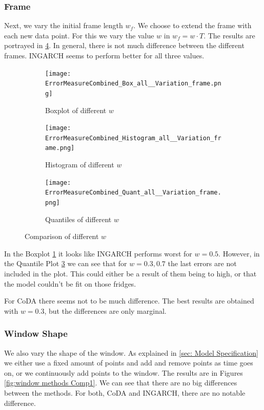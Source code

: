\subsubsection{Frame}
\label{sec:Frame}

Next, we vary the initial frame length $w_f$. We choose to extend the frame with each new data point. For this we vary the value $w$ in $w_f=w\cdot T$. The results are portrayed in \ref{fig:Frame Comp1}. In general, there is not much difference between the different frames. INGARCH seems to perform better for all three values.
\begin{figure}[htb!]
\centering
\begin{subfigure}[b]{0.45\textwidth}
\texttt{[image: ErrorMeasureCombined\_Box\_all\_\_Variation\_frame.png]}
\caption{Boxplot of different $w$}
\label{fig:Frame Box}
\end{subfigure}
\hfill
\begin{subfigure}[b]{0.45\textwidth}
\texttt{[image: ErrorMeasureCombined\_Histogram\_all\_\_Variation\_frame.png]}
\caption{Histogram of different $w$}
\label{fig:Frame Hist}
\end{subfigure}
\hfill
\begin{subfigure}[b]{0.8\textwidth}
\texttt{[image: ErrorMeasureCombined\_Quant\_all\_\_Variation\_frame.png]}
\caption{Quantiles of different $w$}
\label{fig:Frame Quant}
\end{subfigure}
\caption{Comparison of different $w$}
\label{fig:Frame Comp1}
\end{figure}


In the Boxplot \ref{fig:Frame Box} it looks like INGARCH performs worst for $w=0.5$. However, in the Quantile Plot \ref{fig:Frame Quant} we can see that for $w=0.3,0.7$ the last errors are not included  in the plot. This could either be a result of them being to high, or that the model couldn't be fit on those fridges. 

For CoDA there seems not to be much difference. The best results are obtained with $w=0.3$, but the differences are only marginal. 


\subsubsection{Window Shape}
\label{sec:Window Shape}

We also vary the shape of the window. As explained in \ref{sec: Model Specification} we either use a fixed amount of points and add and remove points as time goes on, or we continuously add points to the window. The results are in Figures \ref{fig:window methods Comp1}. We can see that there are no big differences between the methods. For both, CoDA and INGARCH, there are no notable difference. 

